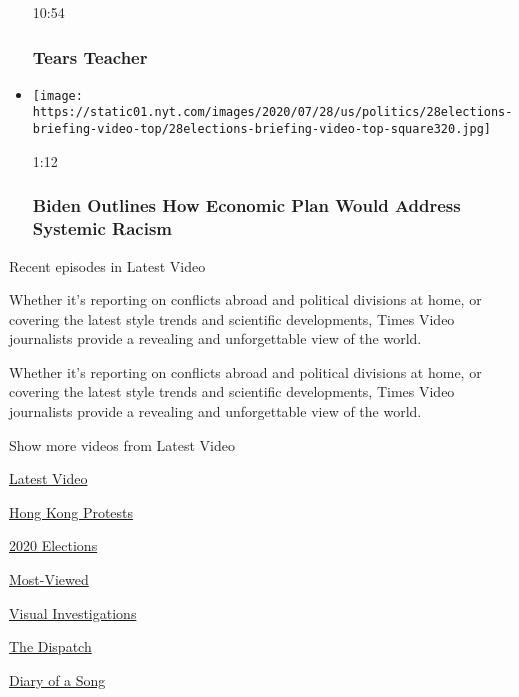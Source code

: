 \begin{itemize}
  10:54

  \hypertarget{tears-teacher}{%
  \subsubsection{Tears Teacher}\label{tears-teacher}}
\item
  \href{https://www.nytimes.com/video/us/politics/100000007260487/watch-live-biden-delivers-speech-on-systemic-racism.html?action=click\&module=video-series-bar\&region=header\&pgtype=Article\&playlistId=video/latest-video}{}

  \texttt{[image: https://static01.nyt.com/images/2020/07/28/us/politics/28elections-briefing-video-top/28elections-briefing-video-top-square320.jpg]}

  1:12

  \hypertarget{biden-outlines-how-economic-plan-would-address-systemic-racism}{%
  \subsubsection{Biden Outlines How Economic Plan Would Address Systemic
  Racism}\label{biden-outlines-how-economic-plan-would-address-systemic-racism}}
\end{itemize}

Recent episodes in Latest Video

Whether it's reporting on conflicts abroad and political divisions at
home, or covering the latest style trends and scientific developments,
Times Video journalists provide a revealing and unforgettable view of
the world.

Whether it's reporting on conflicts abroad and political divisions at
home, or covering the latest style trends and scientific developments,
Times Video journalists provide a revealing and unforgettable view of
the world.

Show more videos from Latest Video

\href{/video}{}

\href{/video/latest-video}{Latest Video}

\href{/video/hk-protest}{Hong Kong Protests}

\href{/video/2020-Elections}{2020 Elections}

\href{/video/Most-Viewed}{Most-Viewed}

\href{/video/investigations}{Visual Investigations}

\href{/video/on-the-ground}{The Dispatch}

\href{/video/diaryofasong}{Diary of a Song}

